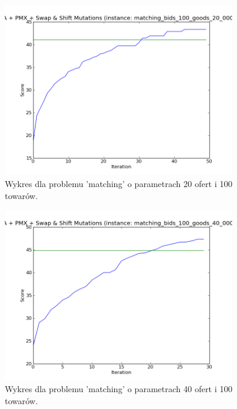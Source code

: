 \begin{frame}
    \begin{figure}
        \centering
        \includegraphics[width=10cm]{wykresy/matching_bids_100_goods_20_0000_txt_1.png}
        \caption{Wykres dla problemu 'matching' o parametrach 20 ofert i 100 towarów.}
    \end{figure}
\end{frame}

\begin{frame}
    \begin{figure}
        \centering
        \includegraphics[width=10cm]{wykresy/matching_bids_100_goods_40_0000_txt_3.png}
        \caption{Wykres dla problemu 'matching' o parametrach 40 ofert i 100 towarów.}
    \end{figure}
\end{frame}

